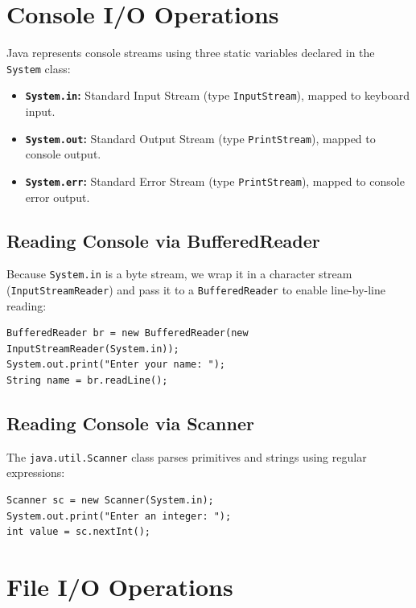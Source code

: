 \documentclass[12pt,a4paper]{article}
\begin{document}
\section{Console I/O Operations}

Java represents console streams using three static variables declared in the \texttt{System} class:
\begin{itemize}[leftmargin=*, itemsep=3pt]
  \item \textbf{\texttt{System.in}:} Standard Input Stream (type \texttt{InputStream}), mapped to keyboard input.
  \item \textbf{\texttt{System.out}:} Standard Output Stream (type \texttt{PrintStream}), mapped to console output.
  \item \textbf{\texttt{System.err}:} Standard Error Stream (type \texttt{PrintStream}), mapped to console error output.
\end{itemize}

\subsection{Reading Console via BufferedReader}
Because \texttt{System.in} is a byte stream, we wrap it in a character stream (\texttt{InputStreamReader}) and pass it to a \texttt{BufferedReader} to enable line-by-line reading:
\begin{verbatim}
BufferedReader br = new BufferedReader(new InputStreamReader(System.in));
System.out.print("Enter your name: ");
String name = br.readLine();
\end{verbatim}

\subsection{Reading Console via Scanner}
The \texttt{java.util.Scanner} class parses primitives and strings using regular expressions:
\begin{verbatim}
Scanner sc = new Scanner(System.in);
System.out.print("Enter an integer: ");
int value = sc.nextInt();
\end{verbatim}

\section{File I/O Operations}
\end{document}
